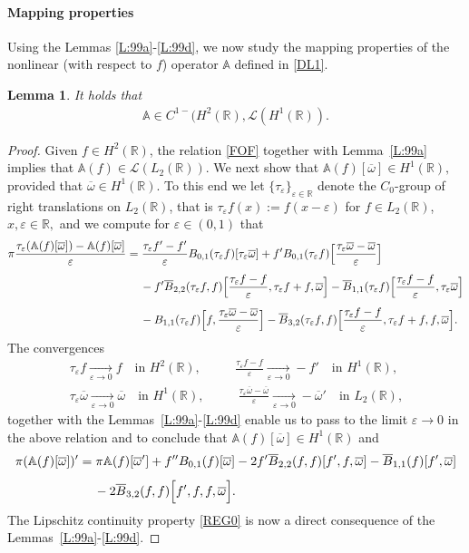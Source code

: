 \documentclass[11pt,reqno]{amsart}
\numberwithin{equation}{section}
\newcommand{\0}{\Omega}
\newcommand{\e}{\varepsilon}
\newcommand{\ov}{\overline}
\newcommand{\oo}{\ov\omega}
\newcommand{\bA}{\mathbb{A}}
\newcommand{\kL}{\mathcal{L}}
\newcommand{\R}{\mathbb{R}}
\newtheorem{lemma}[thm]{Lemma}
\numberwithin{equation}{section}
\begin{document}
\paragraph{\bf Mapping properties}
Using the  Lemmas \ref{L:99a}-\ref{L:99d}, we now study the mapping properties of the nonlinear (with respect to $f$) operator $\bA$ defined in \eqref{DL1}.

\begin{lemma}\label{L:99e} 
It holds   that
\begin{align} \label{REG0}
 \bA\in C^{1-}(H^2(\R),\kL(H^1(\R)).
\end{align}
\end{lemma}
\begin{proof}
Given $f\in H^2(\R)$,  the relation \eqref{FOF} together with Lemma~\ref{L:99a} implies that $\bA(f)\in\kL(L_2(\R)).$
We next show that $\bA(f)[\oo]\in H^1(\R),$ provided that $\oo\in H^1(\R)$.
To this end we let $\{\tau_\e\}_{\e\in\R}$ denote the  $C_0$-group  of right  translations on $L_2(\R)$, that is $\tau_\e f(x):=f(x-\e) $ for $f\in L_2(\R)$, $x,\e\in\R,$ and  we compute for $\e\in(0,1)$ that
\begin{align*}
 \pi\frac{\tau_\e(\bA(f)[\oo]) -\bA(f)[\oo] }{\e}&=\frac{\tau_\e f' -f'}{\e}B_{0,1}(\tau_\e f)[\tau_\e\oo]+f 'B_{0,1}(\tau_\e f )\Big[\frac{\tau_\e \oo -\oo}{\e}\Big]\\[1ex]
 &\hspace{0.424cm}-f'\ov B_{2,2}(\tau_\e f,f)\Big[ \frac{\tau_\e f -f}{\e},\tau_\e f+f,\oo\Big]-\ov B_{1,1}(\tau_\e f)\Big[\frac{\tau_\e f -f}{\e}, \tau_\e\oo\Big]\\[1ex]
 &\hspace{0.424cm}-B_{1,1}(\tau_\e f )\Big[f,\frac{\tau_\e \oo -\oo}{\e}\Big]- \ov B_{3,2}(\tau_\e f,f)\Big[ \frac{\tau_\e f -f}{\e},\tau_\e f+f,f,\oo\Big].
\end{align*}
The convergences 
\begin{align*}
&\tau_\e f\underset{\e\to0}\longrightarrow f  \quad\text{in $H^2(\R),$ } \qquad   \frac{\tau_\e f - f }{\e}\underset{\e\to0}{\longrightarrow} -f' \quad\text{in $H^{1}(\R),$ }\\[1ex]
&\tau_\e \oo\underset{\e\to0}\longrightarrow \oo  \quad\text{in $H^1(\R),$ } \qquad   \frac{\tau_\e \oo - \oo }{\e}\underset{\e\to0}{\longrightarrow} -\oo' \quad\text{in $L_2(\R),$ }
\end{align*}
together with the Lemmas~\ref{L:99a}-\ref{L:99d} enable us to pass to the limit $\e\to0$ in the above relation and to conclude that $\bA(f)[\oo]\in H^1(\R)$ and
\begin{align}
 \pi(\bA(f)[\oo])'&=\pi\bA(f)[\oo']+f''B_{0,1}( f)[\oo]-2f'\ov B_{2,2}(f,f)[f',f,\oo]-\ov B_{1,1}( f)[f', \oo]\nonumber\\[1ex]
 &\hspace{0.424cm}- 2\ov B_{3,2}( f,f)\Big[f',f,f,\oo\Big].\label{derA}
\end{align}
The Lipschitz continuity property \eqref{REG0} is now a direct consequence of  the Lemmas~\ref{L:99a}-\ref{L:99d}.
\end{proof}
\end{document}
